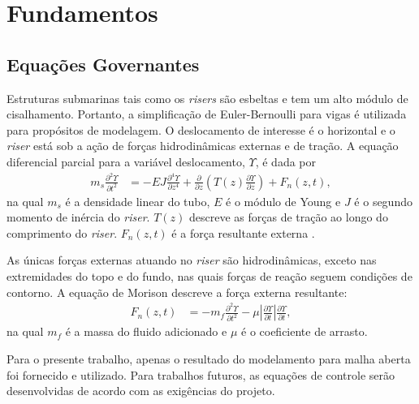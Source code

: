 \chapter{Fundamentos\label{chap:FundamentacaoMatematica}}


\section{Equações Governantes}

Estruturas submarinas tais como os \textit{risers} são esbeltas e tem um alto módulo de cisalhamento. Portanto, a simplificação de Euler-Bernoulli para vigas é utilizada para propósitos de modelagem. O deslocamento de interesse é o horizontal e o \textit{riser} está sob a ação de forças hidrodinâmicas externas e de tração. A equação diferencial parcial para a variável deslocamento, $\Upsilon$, é dada por \begin{align}
	m_s \frac{\partial^2 \Upsilon}{\partial t^2} &= -E J	\frac{\partial^4 \Upsilon}{\partial z^4} + \frac{\partial}{\partial z}\left(T(z) \frac{\partial \Upsilon}{\partial z}\right) + F_n(z,t),
\end{align} na qual $m_s$ é a densidade linear do tubo, $E$ é o módulo de Young e $J$ é o segundo momento de inércia do \textit{riser}. $T(z)$ descreve as forças de tração ao longo do comprimento do \textit{riser}. $F_n(z,t)$ é a força resultante externa \cite{fabricioIFAC}.

As únicas forças externas atuando no \textit{riser} são hidrodinâmicas, exceto nas extremidades do topo e do fundo, nas quais forças de reação seguem condições de contorno. A equação de Morison descreve a força externa resultante: \begin{align}
	F_n(z,t) &= -m_f \frac{\partial^2 \Upsilon}{\partial t^2} - \mu\left|\frac{\partial \Upsilon}{\partial t}\right|\frac{\partial \Upsilon}{\partial t},
\end{align} na qual $m_f$ é a massa do fluido adicionado e $\mu$ é o coeficiente de arrasto. %

Para o presente trabalho, apenas o resultado do modelamento para malha aberta foi fornecido e utilizado. Para trabalhos futuros, as equações de controle serão desenvolvidas de acordo com as exigências do projeto.
